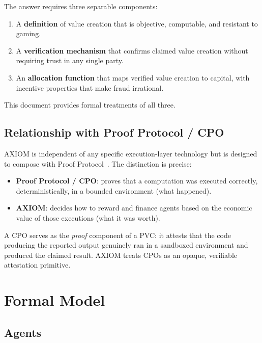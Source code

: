 \documentclass[11pt,a4paper]{article}
\theoremstyle{plain}
\theoremstyle{definition}
\theoremstyle{remark}
\begin{document}
The answer requires three separable components:

\begin{enumerate}[(1)]
  \item A \textbf{definition} of value creation that is objective, computable,
        and resistant to gaming.
  \item A \textbf{verification mechanism} that confirms claimed value creation
        without requiring trust in any single party.
  \item An \textbf{allocation function} that maps verified value creation to
        capital, with incentive properties that make fraud irrational.
\end{enumerate}

This document provides formal treatments of all three.

\subsection{Relationship with Proof Protocol / CPO}

AXIOM is independent of any specific execution-layer technology but is designed
to compose with Proof Protocol~\cite{cpp2025}. The distinction is precise:

\begin{itemize}
  \item \textbf{Proof Protocol / CPO}: proves that a computation was executed
        correctly, deterministically, in a bounded environment (what happened).
  \item \textbf{AXIOM}: decides how to reward and finance agents based on the
        economic value of those executions (what it was worth).
\end{itemize}

A CPO serves as the \emph{proof} component of a PVC: it attests that the code
producing the reported output genuinely ran in a sandboxed environment and
produced the claimed result. AXIOM treats CPOs as an opaque, verifiable
attestation primitive.

\section{Formal Model}

\subsection{Agents}
\end{document}
